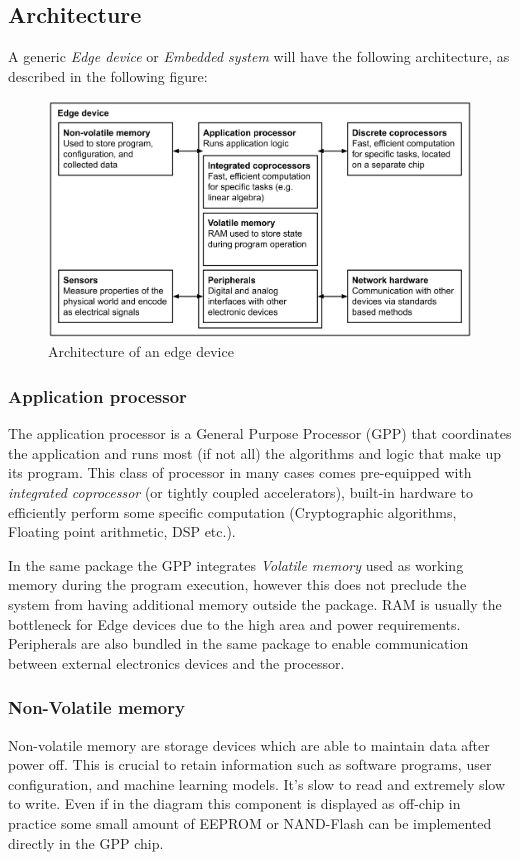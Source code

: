 \documentclass{article}
\begin{document}
    \subsection{Architecture}
      A generic \emph{Edge device} or \emph{Embedded system} will have the following architecture, as described in the following figure:
      \begin{figure}[H]
        \includegraphics[scale=0.4]{../Images/EdgeArch.PNG}
        \centering
        \caption{Architecture of an edge device}
      \end{figure}

      \subsubsection{Application processor}
        The application processor is a General Purpose Processor (GPP) that coordinates the application and runs most (if not all) the algorithms and logic that make up its program.
        This class of processor in many cases comes pre-equipped with \emph{integrated coprocessor} (or tightly coupled accelerators), built-in hardware to efficiently perform some
        specific computation (Cryptographic algorithms, Floating point arithmetic, DSP etc.).

        In the same package the GPP integrates \emph{Volatile memory} used as working memory during the program execution, however this does not preclude the system from having additional
        memory outside the package. RAM is usually the bottleneck for Edge devices due to the high area and power requirements. Peripherals are also bundled in the same package to enable communication between external electronics devices and the processor.

      \subsubsection{Non-Volatile memory}
        Non-volatile memory are storage devices which are able to maintain data after power off. This is crucial to retain information such as software programs, user
        configuration, and machine learning models. It’s slow to read and extremely slow to write. Even if in the diagram this component is displayed as off-chip in practice some 
        small amount of EEPROM or NAND-Flash can be implemented directly in the GPP chip.
\end{document}
